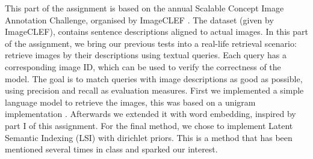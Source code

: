 This part of the assignment is based on the annual Scalable Concept Image Annotation Challenge, organised by ImageCLEF \cite{imageclef}. The dataset (given by ImageCLEF), contains sentence descriptions aligned to actual images. In this part of the assignment, we bring our previous tests into a real-life retrieval scenario: retrieve images by their descriptions using textual queries. Each query has a corresponding image ID, which can be used to verify the correctness of the model. The goal is to match queries with image descriptions as good as possible, using precision and recall as evaluation measures.
\newline
\newline
First we implemented a simple language model to retrieve the images, this was based on a unigram implementation \cite{languagemodelsforinformationretrieval}. Afterwards we extended it with word embedding, inspired by part I of this assignment. For the final method, we chose to implement Latent Semantic Indexing (LSI) with dirichlet priors. This is a method that has been mentioned several times in class and sparked our interest.
